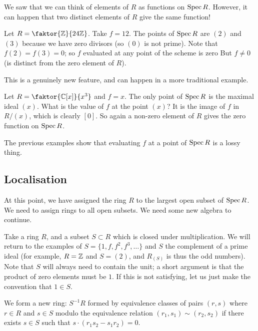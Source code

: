 We saw that we can think of elements of \(R\) as functions on \(\operatorname{Spec} R\).
However, it can happen that two distinct elements of \(R\) give the same function!
\begin{example}
    Let $R=\faktor{\Z}{24\Z}$. Take $f=12$.
    The points of $\operatorname{Spec}{R}$ are $(2)$ and $(3)$ because we have zero divisors (so $(0)$ is not prime).
    Note that $f(2)=f(3)=0$; so $f$ evaluated at any point of the scheme is zero
    But $f\neq 0$ (is distinct from the zero element of \(R\)).
\end{example}

This is a genuinely new feature, and can happen in a more traditional example.

\begin{example}
  Let $R=\faktor{\C[x]}{x^3}$ and $f=x$.
  The only point of \(\operatorname{Spec} R\) is the maximal ideal \((x)\).
  What is the value of $f$ at the point $(x)$?
  It is the image of \(f\) in \(R/(x)\), which is clearly $[0]$.
  So again a non-zero element of \(R\) gives the zero function on \(\operatorname{Spec} R\).
\end{example}

The previous examples show that evaluating $f$ at a point of $\operatorname{Spec}{R}$ is a lossy thing.

\subsection{Localisation}
At this point, we have assigned the ring $R$ to the largest open subset of $\operatorname{Spec}{R}$.
We need to assign rings to all open subsets.
    We need some new algebra to continue.

    Take a ring $R$, and a subset $S\subset R$ which is closed under multiplication.
    We will return to the examples of $S=\{1,f,f^2,f^3,\dots\}$ and $S$ the complement of a prime ideal (for example, $R=\mathbb{Z}$ and $S=(2)$, and $R_{(S)}$ is thus the odd numbers).
    Note that $S$ will always need to contain the unit; a short argument is that the product of zero elements must be $1$.
    If this is not satisfying, let us just make the convention that \(1 \in S\).
    
    We form a new ring: $S^{-1}R$ formed by equivalence classes of pairs \((r,s)\) where \(r \in R\) and \(s \in S\) modulo the equivalence relation $(r_1,s_1)\sim(r_2,s_2)$ if there exists $s\in S$ such that $s\cdot(r_1s_2-s_1r_2)=0$.

